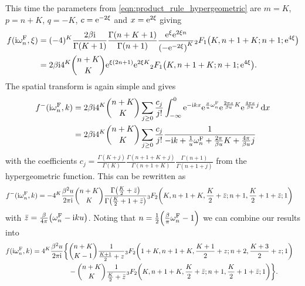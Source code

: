 \documentclass[english, parskip=full]{scrartcl}
\begin{document}
This time the parameters from \autoref{eqn:product_rule_hypergeometric} are $m = K$, $p = n+K$, $q = -K$, $c = \text{e}^{-2\xi}$ and $x= \text{e}^{2\xi}$ giving
\begin{align}
f(\i\omega_n^\F, \xi) &= (-4)^K \frac{2\beta\i}{\Gamma(K+1)} \frac{\Gamma(n+K+1)}{\Gamma(n+1)} \frac{\powe{\xi} \powe{2\xi n}}{\kla*{-\powe{-2\xi}}^{K}} {}_2F_1\kla*{K, n+1+K; n + 1; \powe{4\xi}}\\
&= 2\beta \i 4^K \binom{n+K}{K} \powe{\xi(2n+1)} \powe{2\xi K} {}_2F_1\kla*{K, n+1+K; n+1; \powe{4\xi}}.
\end{align}
The spatial transform is again simple and gives
\begin{align}
f^{-}(\text{i}\omega_n^{\text{F}}, k) &= 2\beta \text{i} 4^K \binom{n+K}{K} \sum_{j\ge 0} \frac{c_j}{j!} \int_{-\infty}^{0} \text{e}^{-\text{i} kx} \text{e}^{\frac{x}{u} \omega_n^{\text{F}}} \text{e}^{\frac{2\pi x}{\beta u} K} \text{e}^{\frac{4\pi x}{\beta u}j}  \,\mathrm{d}x\\
&= 2\beta \text{i} 4^K \binom{n+K}{K} \sum_{j\ge 0} \frac{c_j}{j!} \frac{1}{-\text{i} k + \frac{1}{u} \omega_n^{\text{F}} + \frac{2\pi}{\beta u} K + \frac{4\pi}{\beta u}j}
\end{align}
with the coefficients $c_j = \frac{\Gamma(K + j)}{\Gamma(K)} \frac{\Gamma(n + 1 + K + j)}{\Gamma(n + 1 + K)} \frac{\Gamma(n+1)}{\Gamma(n+1+j)}$ from the hypergeometric function.
This can be rewritten as
\begin{align}
f^{-}(\i\omega_n^\F, k) &= -4^K \frac{\beta^2u}{2\pi\i} \binom{n+K}{K} \frac{\Gamma\kla*{\frac{K}{2} + \bar{z}}}{\Gamma\kla*{\frac{K}{2} + 1 + \bar{z}}} {}_3F_2\kla*{K, n+1+K, \frac{K}{2} + \bar{z}; n+1, \frac{K}{2} + 1 + \bar{z}; 1}
\end{align}
with $\bar{z} = \frac{\beta}{4\pi} \kla*{\omega_n^\F - \i ku}$.
Noting that $n = \frac{1}{2} \kla*{\frac{\beta}{\pi} \omega_n^\F - 1}$ we can combine our results into
\begin{align}
f(\i\omega_n^\F, k) &= \bsplit{4^K \frac{\beta^2u}{2\pi\i} \klc[\bigg]{ & \binom{n + K}{K-1} \frac{1}{\frac{K+1}{2} + z} {}_3F_2\kla*{1 + K, n + 1 + K, \frac{K + 1}{2} + z; n + 2, \frac{K + 3}{2} + z; 1}\\
& - \binom{n+K}{K} \frac{1}{\frac{K}{2} + \bar{z}} {}_3F_2\kla*{K, n+1+K, \frac{K}{2} + \bar{z}; n+1, \frac{K}{2} + 1 + \bar{z}; 1}}.}
\end{align}
\end{document}
